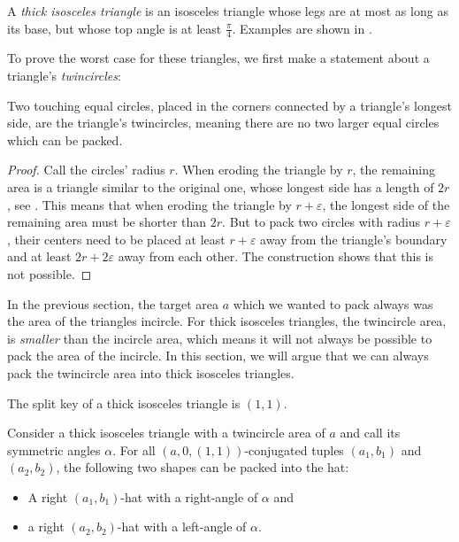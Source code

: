 \documentclass[a4paper,style=print,bibliography=totoc,nexus,lnum,extramargin]{tubsbook}
\begin{document}
\begin{definition}
    A \emph{thick isosceles triangle} is an isosceles triangle whose legs are at most as long as its base, but whose top angle is at least $\frac{\pi}{4}$. Examples are shown in .
\end{definition}


To prove the worst case for these triangles, we first make a statement about a triangle's \emph{twincircles}:

\begin{lemma}\label{th:iso-worst}
    Two touching equal circles, placed in the corners connected by a triangle's longest side, are the triangle's twincircles, meaning there are no two larger equal circles which can be packed.
\end{lemma}

\begin{proof}
    Call the circles' radius $r$.
    When eroding the triangle by $r$, the remaining area is a triangle similar to the original one, whose longest side has a length of $2r$, see . This means that when eroding the triangle by $r+\varepsilon$, the longest side of the remaining area must be shorter than $2r$.
    But to pack two circles with radius $r+\varepsilon$, their centers need to be placed at least $r+\varepsilon$ away from the triangle's boundary and at least $2r+2\varepsilon$ away from each other. The construction shows that this is not possible.
\end{proof}


In the previous section, the target area $a$ which we wanted to pack always was the area of the triangles incircle. For thick isosceles triangles, the twincircle area, is \emph{smaller} than the incircle area, which means it will not always be possible to pack the area of the incircle.
In this section, we will argue that we can always pack the twincircle area into thick isosceles triangles.

\begin{definition}
    The split key of a thick isosceles triangle is $(1,1)$.
\end{definition}

\begin{lemma}\label{th:hats-in-iso}
    Consider a thick isosceles triangle with a twincircle area of $a$ and call its symmetric angles $\alpha$.
    For all $(a,0,(1,1))$-conjugated tuples $(a_1, b_1)$ and $(a_2, b_2)$, the following two shapes can be packed into the hat:
    \begin{itemize}
        \item A right $(a_1,b_1)$-hat with a right-angle of $\alpha$ and
        \item a right $(a_2,b_2)$-hat with a left-angle of $\alpha$.
    \end{itemize}
\end{lemma}
\end{document}
